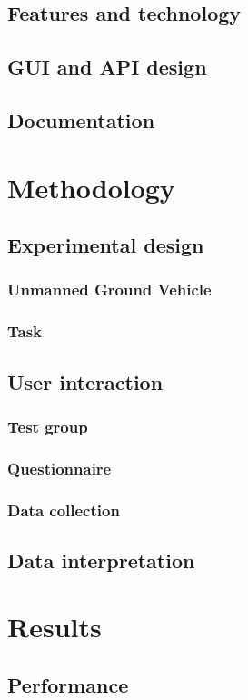 \documentclass[b5paper,10pt,twoside]{book}
\begin{document}
{	\section{Features and technology}
	\section{GUI and API design}
	\section{Documentation}
	
\chapter{Methodology}
	\section{Experimental design}
		\subsection{Unmanned Ground Vehicle}
		\subsection{Task}	
	\section{User interaction}
		\subsection{Test group}
		\subsection{Questionnaire}
		\subsection{Data collection}
	\section{Data interpretation}

\chapter{Results}
	\section{Performance}
}
\end{document}
